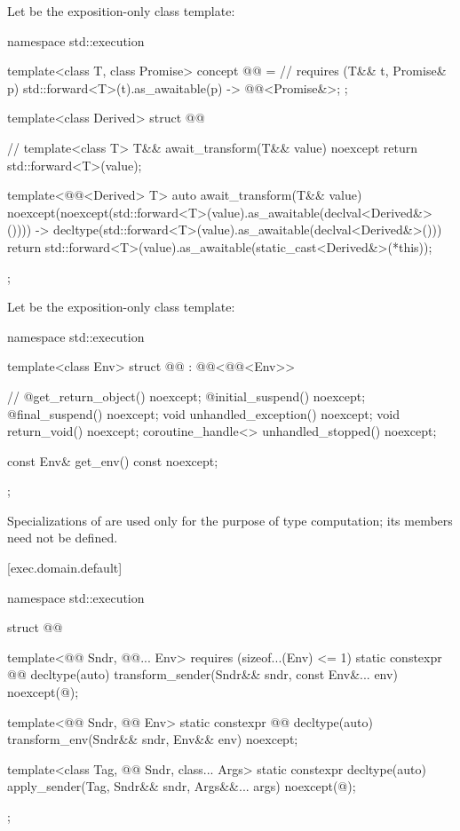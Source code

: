 \pnum
Let  be the exposition-only class template:
\begin{codeblock}
namespace std::execution {
  template<class T, class Promise>
    concept @@ =                                  // \expos
      requires (T&& t, Promise& p) {
        { std::forward<T>(t).as_awaitable(p) } -> @@<Promise&>;
      };

  template<class Derived>
    struct @@ {                               // \expos
      template<class T>
        T&& await_transform(T&& value) noexcept {
          return std::forward<T>(value);
        }

      template<@@<Derived> T>
        auto await_transform(T&& value)
          noexcept(noexcept(std::forward<T>(value).as_awaitable(declval<Derived&>())))
          -> decltype(std::forward<T>(value).as_awaitable(declval<Derived&>())) {
          return std::forward<T>(value).as_awaitable(static_cast<Derived&>(*this));
        }
    };
}
\end{codeblock}

\pnum
Let  be the exposition-only class template:
\begin{codeblock}
namespace std::execution {
  template<class Env>
  struct @@ : @@<@@<Env>> { // \expos
    @\unspec@ get_return_object() noexcept;
    @\unspec@ initial_suspend() noexcept;
    @\unspec@ final_suspend() noexcept;
    void unhandled_exception() noexcept;
    void return_void() noexcept;
    coroutine_handle<> unhandled_stopped() noexcept;

    const Env& get_env() const noexcept;
  };
}
\end{codeblock}
\begin{note}
Specializations of  are used only for the purpose of type computation;
its members need not be defined.
\end{note}

[exec.domain.default]{}

\pnum
\begin{codeblock}
namespace std::execution {
  struct @@ {
    template<@@ Sndr, @@... Env>
        requires (sizeof...(Env) <= 1)
      static constexpr @@ decltype(auto) transform_sender(Sndr&& sndr, const Env&... env)
        noexcept(@\seebelow@);

    template<@@ Sndr, @@ Env>
      static constexpr @@ decltype(auto) transform_env(Sndr&& sndr, Env&& env) noexcept;

    template<class Tag, @@ Sndr, class... Args>
      static constexpr decltype(auto) apply_sender(Tag, Sndr&& sndr, Args&&... args)
        noexcept(@\seebelow@);
  };
}
\end{codeblock}

